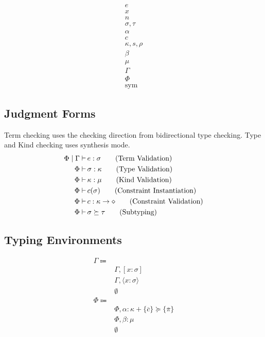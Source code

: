 \documentclass {article}
\begin{document}
\begin{align*}
e \tag{Terms} \\
x \tag{Variables} \\
n \tag{Numbers} \\
\sigma, \tau \tag{Types} \\
\alpha \tag{Type Variables} \\
c \tag{Constraints} \\
\kappa, s, \rho \tag{Kinds} \\
\beta \tag{Kind Variables} \\
\mu \tag{Sorts} \\
\Gamma \tag{Type Environment} \\
\Phi \tag{Misc Environment} \\
\text{sym} \tag{Symbol}
\end{align*}


\subsection{Judgment Forms}
Term checking uses the checking direction from bidirectional type checking.
Type and Kind checking uses synthesis mode.
\begin{align*}
\Phi \mid \Gamma \vdash \, & e : \sigma \tag{\text{Term Validation}} \\
\Phi \vdash \, & \sigma : \kappa \tag{\text{Type Validation}} \\
\Phi \vdash \, & \kappa : \mu \tag{Kind Validation} \\
\Phi \vdash \, &c (\sigma) \tag{Constraint Instantiation} \\
\Phi \vdash \, &c : \kappa \to \diamond \tag{Constraint Validation} \\
\Phi \vdash \, & \sigma \succeq \tau \tag{Subtyping}
\end{align*}

\subsection{Typing Environments}
\begin{align*}
\Gamma \Coloneqq & \\
& \Gamma, [x : \sigma] \\
& \Gamma, \langle x : \sigma \rangle \\
& \emptyset \\
\Phi \Coloneqq & \\
& \Phi, \alpha : \kappa + \{ \overline c \} \succeq \{ \overline \pi \} \\
& \Phi, \beta : \mu \\
& \emptyset \\
\end{align*}
\end{document}
